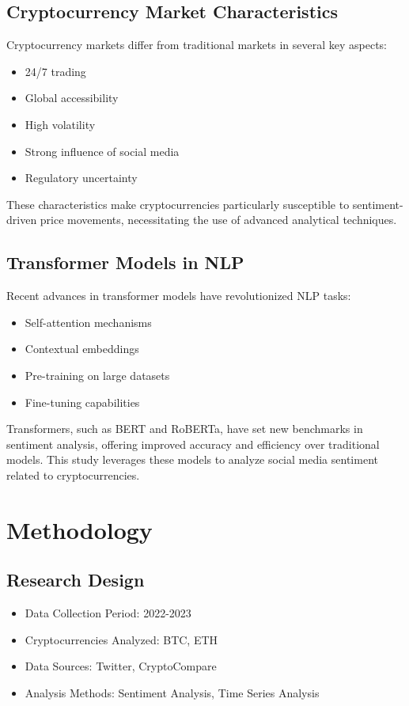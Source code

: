 \documentclass[12pt,a4paper]{report}
\begin{document}
\section{Cryptocurrency Market Characteristics}
Cryptocurrency markets differ from traditional markets in several key aspects:
\begin{itemize}
    \item 24/7 trading
    \item Global accessibility
    \item High volatility
    \item Strong influence of social media
    \item Regulatory uncertainty
\end{itemize}
These characteristics make cryptocurrencies particularly susceptible to sentiment-driven price movements, necessitating the use of advanced analytical techniques.

\section{Transformer Models in NLP}
Recent advances in transformer models have revolutionized NLP tasks:
\begin{itemize}
    \item Self-attention mechanisms
    \item Contextual embeddings
    \item Pre-training on large datasets
    \item Fine-tuning capabilities
\end{itemize}
Transformers, such as BERT and RoBERTa, have set new benchmarks in sentiment analysis, offering improved accuracy and efficiency over traditional models. This study leverages these models to analyze social media sentiment related to cryptocurrencies.

\chapter{Methodology}
\section{Research Design}
\begin{itemize}
    \item Data Collection Period: 2022-2023
    \item Cryptocurrencies Analyzed: BTC, ETH
    \item Data Sources: Twitter, CryptoCompare
    \item Analysis Methods: Sentiment Analysis, Time Series Analysis
\end{itemize}
\end{document}
